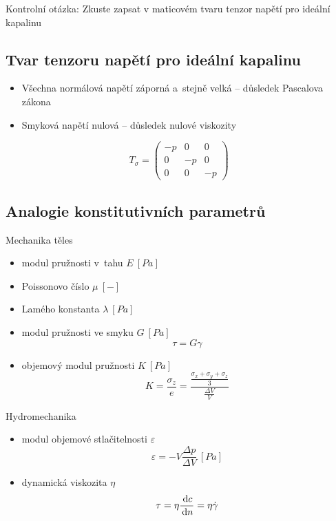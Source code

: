 Kontrolní otázka:
Zkuste zapsat v maticovém tvaru tenzor napětí pro ideální kapalinu
\subsection{Tvar tenzoru napětí pro ideální kapalinu}
\begin{itemize}
	\item Všechna normálová napětí záporná a~stejně velká -- důsledek Pascalova zákona
	\item Smyková napětí nulová -- důsledek nulové viskozity
\end{itemize}
\begin{equation}
T_\sigma = \left( \begin{matrix}
-p & 0 & 0\\
0 & -p & 0\\
0 & 0 & -p
\end{matrix} \right)
\end{equation}

\subsection{Analogie konstitutivních parametrů}
Mechanika těles
\begin{itemize}
	\item modul pružnosti v~tahu $E\:[Pa]$
	\item Poissonovo číslo $\mu\:[-]$
	\item Lamého konstanta $\lambda\:[Pa]$
	\item modul pružnosti ve smyku $G\:[Pa]$
	\begin{equation}
	\tau = G \gamma
	\end{equation}
	\item objemový modul pružnosti $K\:[Pa]$
	\begin{equation}
	K = \frac{\sigma_z}{e} = \frac{\frac{\sigma_x + \sigma_y + \sigma_z}{3}}{\frac{\Delta V}{V}}
	\end{equation}
\end{itemize}

Hydromechanika
\begin{itemize}
	\item modul objemové stlačitelnosti $\varepsilon$
	\begin{equation}
		\varepsilon = -V \frac{\Delta p}{\Delta V}\:[Pa]
	\end{equation}
	\item dynamická viskozita $\eta$
	\begin{equation}
		\tau = \eta \frac{\,\mathrm{d} c}{\,\mathrm{d} n} = \eta \dot{\gamma}
	\end{equation}
\end{itemize}

